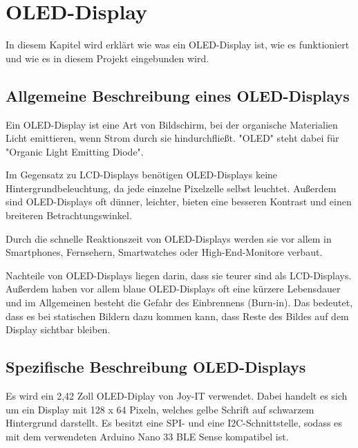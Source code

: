 %
%

\chapter{OLED-Display }

In diesem Kapitel wird erklärt wie was ein OLED-Display ist, wie es funktioniert und wie es in diesem Projekt eingebunden wird.

\section{Allgemeine Beschreibung eines OLED-Displays}

Ein OLED-Display ist eine Art von Bildschirm, bei der organische Materialien Licht emittieren, wenn Strom durch sie hindurchfließt. "OLED" steht dabei für "Organic Light Emitting Diode".

Im Gegensatz zu LCD-Displays benötigen OLED-Displays keine Hintergrundbeleuchtung, da jede einzelne Pixelzelle selbst leuchtet. Außerdem sind OLED-Displays oft dünner, leichter, bieten eine besseren Kontrast und einen breiteren Betrachtungswinkel. 

Durch die schnelle Reaktionszeit von OLED-Displays werden sie vor allem in Smartphones, Fernsehern, Smartwatches oder High-End-Monitore verbaut. 

Nachteile von OLED-Displays liegen darin, dass sie teurer sind als LCD-Displays. Außerdem haben vor allem blaue OLED-Displays oft eine kürzere Lebensdauer und im Allgemeinen besteht die Gefahr des Einbrennens (Burn-in). Das bedeutet, dass es bei statischen Bildern dazu kommen kann, dass Reste des Bildes auf dem Display sichtbar bleiben. \cite{Goethel}

\section{Spezifische Beschreibung OLED-Displays}

Es wird ein 2,42 Zoll OLED-Diplay von Joy-IT verwendet. Dabei handelt es sich um ein Display mit 128 x 64 Pixeln, welches gelbe Schrift auf schwarzem Hintergrund darstellt. Es besitzt eine SPI- und eine I2C-Schnittstelle, sodass es mit dem verwendeten Arduino Nano 33 BLE Sense kompatibel ist. \cite{OLED.1}

